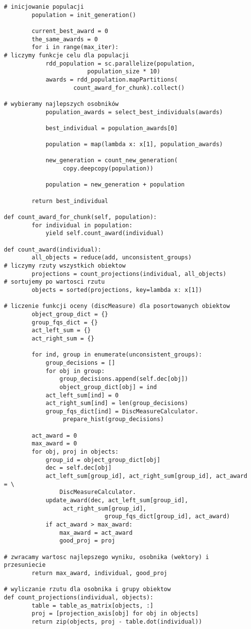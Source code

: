 \documentclass[magisterska]{pracamgr}
\theoremstyle{plain}
\theoremstyle{definition}
\theoremstyle{remark}
\begin{document}
\begin{lstlisting}
# inicjowanie populacji
        population = init_generation()

        current_best_award = 0
        the_same_awards = 0
        for i in range(max_iter):
# liczymy funkcje celu dla populacji
            rdd_population = sc.parallelize(population, 
					    population_size * 10)
            awards = rdd_population.mapPartitions(
				    count_award_for_chunk).collect()
	    
# wybieramy najlepszych osobników
            population_awards = select_best_individuals(awards)

            best_individual = population_awards[0]

            population = map(lambda x: x[1], population_awards)

            new_generation = count_new_generation(
			     copy.deepcopy(population))

            population = new_generation + population

        return best_individual
        
def count_award_for_chunk(self, population):
        for individual in population:
            yield self.count_award(individual)
            
def count_award(individual):
        all_objects = reduce(add, unconsistent_groups)
# liczymy rzuty wszystkich obiektow
        projections = count_projections(individual, all_objects)
# sortujemy po wartosci rzutu
        objects = sorted(projections, key=lambda x: x[1])

# liczenie funkcji oceny (discMeasure) dla posortowanych obiektow
        object_group_dict = {}
        group_fqs_dict = {}
        act_left_sum = {}
        act_right_sum = {}

        for ind, group in enumerate(unconsistent_groups):
            group_decisions = []
            for obj in group:
                group_decisions.append(self.dec[obj])
                object_group_dict[obj] = ind
            act_left_sum[ind] = 0
            act_right_sum[ind] = len(group_decisions)
            group_fqs_dict[ind] = DiscMeasureCalculator.
				 prepare_hist(group_decisions)

        act_award = 0
        max_award = 0
        for obj, proj in objects:
            group_id = object_group_dict[obj]
            dec = self.dec[obj]
            act_left_sum[group_id], act_right_sum[group_id], act_award = \
                DiscMeasureCalculator.
	        update_award(dec, act_left_sum[group_id], 
			     act_right_sum[group_id],
                             group_fqs_dict[group_id], act_award)
            if act_award > max_award:
                max_award = act_award
                good_proj = proj
                
# zwracamy wartosc najlepszego wyniku, osobnika (wektory) i przesuniecie
        return max_award, individual, good_proj  

# wyliczanie rzutu dla osobnika i grupy obiektow 
def count_projections(individual, objects):
        table = table_as_matrix[objects, :]
        proj = [projection_axis[obj] for obj in objects]
        return zip(objects, proj - table.dot(individual))
\end{lstlisting}
\end{document}
